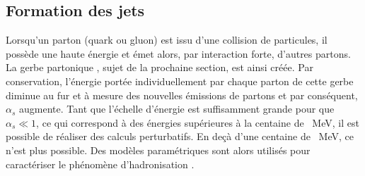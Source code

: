 \subsection{Formation des jets}\label{chapter-MSSM-formation_jets}
Lorsqu'un parton (quark ou gluon) est issu d'une collision de particules, il possède une haute énergie et émet alors, par interaction forte, d'autres partons.
La \og gerbe partonique \fg, sujet de la prochaine section, est ainsi créée.
Par conservation, l'énergie portée individuellement par chaque parton de cette gerbe diminue au fur et à mesure des nouvelles émissions de partons et par conséquent, $\alpha_s$ augmente.
Tant que l'échelle d'énergie est suffisamment grande pour que $\alpha_s \ll 1$, ce qui correspond à des énergies supérieures à la centaine de \SI{}{\MeV}, il est possible de réaliser des calculs perturbatifs.
En deçà d'une centaine de \SI{}{\MeV}, ce n'est plus possible.
Des modèles paramétriques sont alors utilisés pour caractériser le phénomène d'\og hadronisation \fg.

